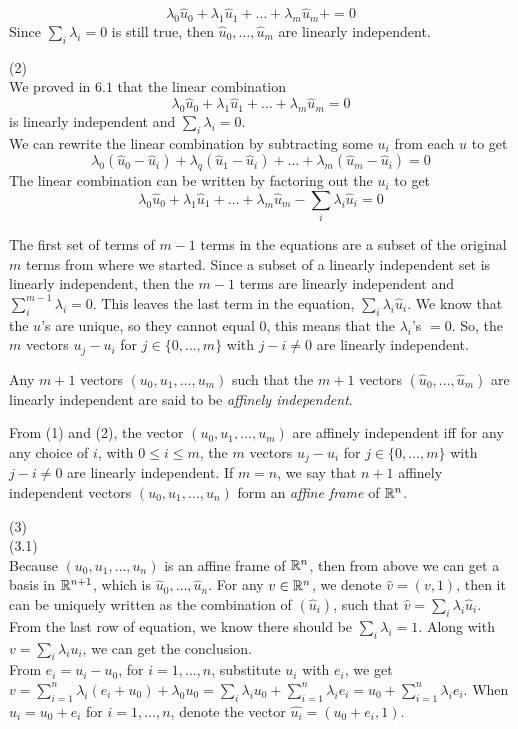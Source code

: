 \documentclass[12pt]{article}
\begin{document}
$$\lambda_0 \hat{u}_0  + \lambda_1 \hat{u}_1  + \ldots + \lambda_m \hat{u}_m  + = 0$$ Since $\sum_{i} \lambda_i = 0$ is still true, then $\hat{u}_0, \ldots, \hat{u}_m$ are linearly independent.   


\medskip
(2) \\
We proved in $6.1$ that the linear combination $$\lambda_0 \hat{u}_0  + \lambda_1 \hat{u}_1  + \ldots + \lambda_m \hat{u}_m  = 0$$ is linearly independent and $\sum_{i} \lambda_i = 0$. \\

We can rewrite the linear combination by subtracting some $u_i$ from each $u$ to get $$\lambda_0 (\hat{u}_0 - \hat{u}_i)  + \lambda_q (\hat{u}_1 - \hat{u}_i)+ \ldots + \lambda_m (\hat{u}_m - \hat{u}_i) = 0$$ The linear combination can be written by factoring out the $u_i$ to get  $$\lambda_0 \hat{u}_0  + \lambda_1 \hat{u}_1 + \ldots + \lambda_m \hat{u}_m  -  \sum_{i} \lambda_i \hat{u}_i= 0$$

The first set of terms of $m-1$ terms in the equations are a subset of the original $m$ terms from where we started. Since a subset of a linearly independent set is linearly independent, then the $m-1$ terms are linearly independent and $\sum_{i}^{m-1} \lambda_i =0$. This leaves the last term in the equation, $\sum_{i} \lambda_i \hat{u}_i$. We know that the $u$'s are unique, so they cannot equal $0$, this means that the $\lambda_i$'s $=0$. So, the
$m$ vectors $u_j - u_i$  for $j \in \{0, \ldots, m\}$ with $j - i \not = 0$
are linearly independent. 

\medskip
Any $m + 1$ vectors  $(u_0, u_1, \ldots, u_{m })$ such that
the  $m + 1$ vectors
$(\widehat{u}_0, \ldots,  \widehat{u}_m)$ are linearly independent
are said to be {\it affinely independent\/}.

\medskip
From (1) and (2), the vector $(u_0, u_1, \ldots, u_{m })$ 
are affinely independent iff
for any  any choice of $i$, with $0 \leq i \leq m$, the
$m$ vectors $u_j - u_i$  for $j \in \{0, \ldots, m\}$ with $j - i \not = 0$
are linearly independent.
If $m = n$,  we say that $n + 1$ affinely independent 
vectors  $(u_0, u_1, \ldots, u_{n })$ form an {\it affine frame\/} of $\mathbb{R}^n$. 

\medskip
(3) \\
(3.1) \\
\medskip
Because $(u_0, u_1, \ldots, u_{n })$ is an affine frame of $\mathbb{R}^n$, then from above we can get a basis in $\mathbb{R}^{n+1}$, which is $\widehat{u}_0, \ldots,  \widehat{u}_{n}$. For any $v \in \mathbb{R}^n$, we denote $\widehat{v} = (v, 1)$, then it can be uniquely written as the combination of $(\widehat{u}_i)$, such that $\widehat{v} = \sum_i \lambda_i \widehat{u}_i$. From the last row of equation, we know there should be $\sum_i \lambda_i = 1$. Along with $v = \sum_i \lambda_i u_i$, we can get the conclusion.\\
\medskip
From $e_i = u_i -  u_0$, for $i = 1, \ldots, n$, substitute $u_i$ with $e_i$, we get $v = \sum_{i=1}^n \lambda_i (e_i + u_0) + \lambda_0 u_0 = \sum_i \lambda_i u_0 + \sum_{i=1}^n \lambda_i e_i = u_0 + \sum_{i=1}^n \lambda_i e_i$.
When $u_i = u_0 + e_i$ for $i = 1, \ldots, n$, denote the vector $\widehat{u_i} = (u_0 + e_i, 1)$. 
\end{document}
